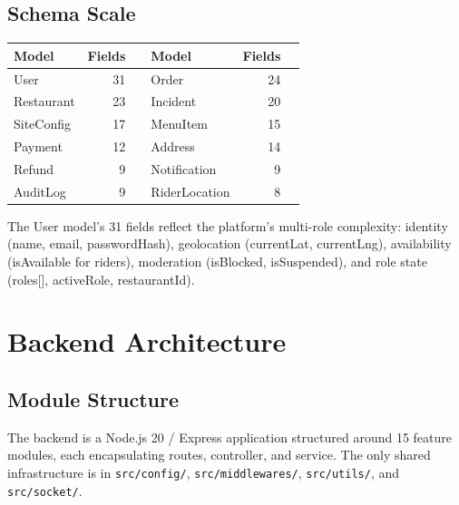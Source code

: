 \documentclass[11pt,a4paper,twoside]{book}
\begin{document}
\section{Schema Scale}

\begin{center}\small
\begin{tabular}{lrl lrl}
\toprule
\textbf{Model} & \textbf{Fields} && \textbf{Model} & \textbf{Fields} \\
\midrule
User          & 31 && Order     & 24 \\
Restaurant    & 23 && Incident  & 20 \\
SiteConfig    & 17 && MenuItem  & 15 \\
Payment       & 12 && Address   & 14 \\
Refund        & 9  && Notification & 9 \\
AuditLog      & 9  && RiderLocation & 8 \\
\bottomrule
\end{tabular}
\end{center}

The User model's 31 fields reflect the platform's multi-role complexity:
identity (name, email, passwordHash), geolocation (currentLat, currentLng),
availability (isAvailable for riders), moderation (isBlocked, isSuspended),
and role state (roles[], activeRole, restaurantId).

\chapter{Backend Architecture}

\section{Module Structure}

The backend is a Node.js 20 / Express application structured around 15 feature
modules, each encapsulating routes, controller, and service.  The only shared
infrastructure is in \texttt{src/config/}, \texttt{src/middlewares/},
\texttt{src/utils/}, and \texttt{src/socket/}.
\end{document}

